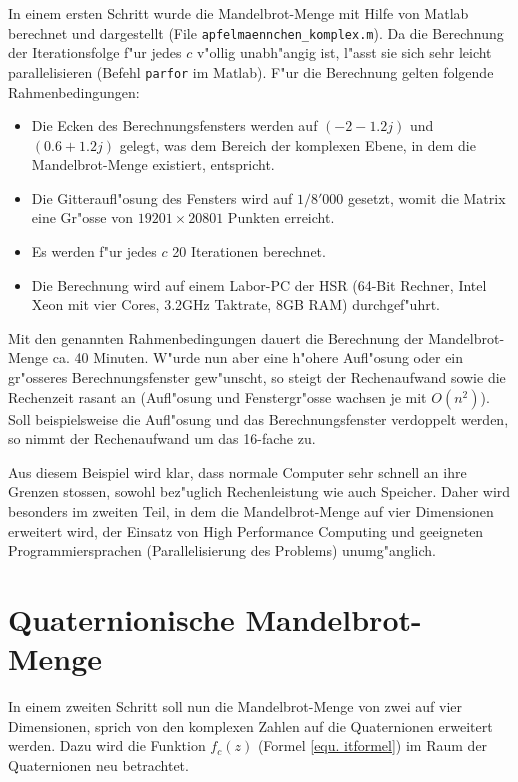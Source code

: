 \begin{refsection}
In einem ersten Schritt wurde die Mandelbrot-Menge mit Hilfe von Matlab
berechnet und dargestellt (File  {\tt apfelmaennchen\_komplex.m}). Da
die Berechnung der Iterationsfolge f"ur jedes $c$ v"ollig unabh"angig
ist, l"asst sie sich sehr leicht parallelisieren (Befehl {\tt parfor}
im Matlab). F"ur die Berechnung gelten folgende Rahmenbedingungen:
\begin{itemize}
\item Die Ecken des Berechnungsfensters werden auf $(-2-1.2 j)$ und $(0.6+1.2 j)$ gelegt, was dem Bereich der komplexen Ebene, in dem die Mandelbrot-Menge existiert, entspricht.
\item Die Gitteraufl"osung des Fensters wird auf $1/8'000$ gesetzt, womit die Matrix eine Gr"osse von $19201\times 20801$ Punkten erreicht.
\item Es werden f"ur jedes $c$ 20 Iterationen berechnet.
\item Die Berechnung wird auf einem Labor-PC der HSR (64-Bit Rechner, Intel Xeon mit vier Cores, 3.2GHz Taktrate, 8GB RAM) durchgef"uhrt.
\end{itemize}
Mit den genannten Rahmenbedingungen dauert die Berechnung der
Mandelbrot-Menge ca. 40 Minuten. W"urde nun aber eine h"ohere
Aufl"osung oder ein gr"osseres Berechnungsfenster gew"unscht, so
steigt der Rechenaufwand sowie die Rechenzeit rasant an (Aufl"osung
und Fenstergr"osse wachsen je mit $O(n^2)$). Soll beispielsweise die
Aufl"osung und das Berechnungsfenster verdoppelt werden, so nimmt der
Rechenaufwand um das 16-fache zu.

Aus diesem Beispiel wird klar, dass normale Computer sehr schnell an ihre
Grenzen stossen, sowohl bez"uglich Rechenleistung wie auch Speicher. Daher
wird besonders im zweiten Teil, in dem die Mandelbrot-Menge auf vier
Dimensionen erweitert wird, der Einsatz von High Performance Computing
und geeigneten Programmiersprachen (Parallelisierung des Problems)
unumg"anglich.

\section{Quaternionische Mandelbrot-Menge}
In einem zweiten Schritt soll nun die Mandelbrot-Menge von zwei
auf vier Dimensionen, sprich von den komplexen Zahlen auf die
Quaternionen erweitert werden. Dazu wird die Funktion $f_c(z)$ (Formel
\ref{equ. itformel}) im Raum der Quaternionen neu betrachtet.


\end{refsection}
